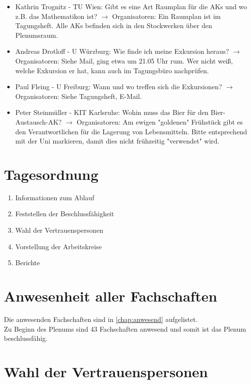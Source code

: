 \begin{itemize}
    \item Kathrin Trognitz - TU Wien:  Gibt es eine Art Raumplan für die AKs und wo z.B. das Mathematikon ist? $\rightarrow$ Organisatoren: Ein Raumplan ist im Tagungsheft. Alle AKs befinden sich in den Stockwerken über den Plenumsraum.
    \item Andreas Drotloff - U Würzburg:  Wie finde ich meine Exkursion heraus? $\rightarrow$ Organisatoren: Siehe Mail, ging etwa um 21.05 Uhr rum. Wer nicht weiß, welche Exkursion er hat, kann auch im Tagungsbüro nachprüfen.
    \item Paul Fleing - U Freiburg:  Wann und wo treffen sich die Exkursionen? $\rightarrow$ Organisatoren: Siehe Tagungsheft, E-Mail.
    \item Peter Steinmüller - KIT Karlsruhe:  Wohin muss das Bier für den Bier-Austausch-AK? $\rightarrow$ Organisatoren: Am ewigen "goldenen" Frühstück gibt es den Verantwortlichen für die Lagerung von Lebensmitteln. Bitte entsprechend mit der Uni markieren, damit dies nicht frühzeitig "verwendet" wird.
  \end{itemize}

\vspace{-3mm}
\section{Tagesordnung}
  \begin{enumerate}
    \item Informationen zum Ablauf
    \item Feststellen der Beschlussfähigkeit
    \item Wahl der Vertrauenspersonen
    \item Vorstellung der Arbeitskreise
    \item Berichte
  \end{enumerate}

\section{Anwesenheit aller Fachschaften}
  Die anwesenden Fachschaften sind in \autoref{chap:anwesend} aufgelistet. \\
  Zu Beginn des Plenums sind 43 Fachschaften anwesend und somit ist das Plenum beschlussfähig.

\section{Wahl der Vertrauenspersonen}

